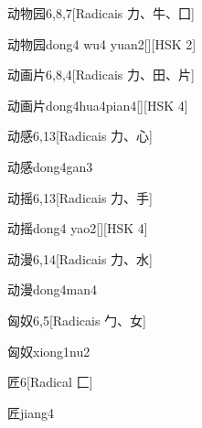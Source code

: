 \begin{entry}{动物园}{6,8,7}[Radicais ⼒、⽜、⼞]
  \begin{phonetics}{动物园}{dong4 wu4 yuan2}[][HSK 2]
  \end{phonetics}
\end{entry}

\begin{entry}{动画片}{6,8,4}[Radicais ⼒、⽥、⽚]
  \begin{phonetics}{动画片}{dong4hua4pian4}[][HSK 4]
  \end{phonetics}
\end{entry}

\begin{entry}{动感}{6,13}[Radicais ⼒、⼼]
  \begin{phonetics}{动感}{dong4gan3}
  \end{phonetics}
\end{entry}

\begin{entry}{动摇}{6,13}[Radicais ⼒、⼿]
  \begin{phonetics}{动摇}{dong4 yao2}[][HSK 4]
  \end{phonetics}
\end{entry}

\begin{entry}{动漫}{6,14}[Radicais ⼒、⽔]
  \begin{phonetics}{动漫}{dong4man4}
  \end{phonetics}
\end{entry}

\begin{entry}{匈奴}{6,5}[Radicais ⼓、⼥]
  \begin{phonetics}{匈奴}{xiong1nu2}
  \end{phonetics}
\end{entry}

\begin{entry}{匠}{6}[Radical ⼕]
  \begin{phonetics}{匠}{jiang4}
  \end{phonetics}
\end{entry}

